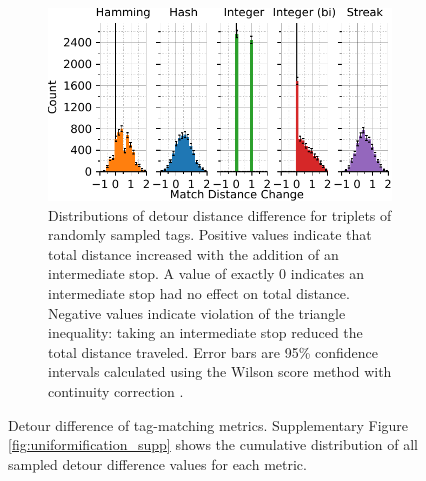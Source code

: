 \begin{figure}
\begin{center}
\begin{minipage}{\linewidth}
\begin{subfigure}[b]{\linewidth}
\includegraphics[width=\linewidth]{img/detour_difference/bitweight=0dot5+seed=1+title=low-triplet-analysis+viz=hist+_data_hathash_hash=6b0749ef97a58721+_script_fullcat_hash=866294f0a66ef153+ext=}
\caption{
Distributions of detour distance difference for triplets of randomly sampled tags.
Positive values indicate that total distance increased with the addition of an intermediate stop.
A value of exactly 0 indicates an intermediate stop had no effect on total distance.
Negative values indicate violation of the triangle inequality: taking an intermediate stop reduced the total distance traveled.
Error bars are 95\% confidence intervals calculated using the Wilson score method with continuity correction \citep{newcombe1998two}.
} \label{fig:detour_difference_distribution}

\end{subfigure}
\end{minipage}

\caption{
Detour difference of tag-matching metrics.
Supplementary Figure \ref{fig:uniformification_supp} shows the cumulative distribution of all sampled detour difference values for each metric.
}
\label{fig:detour_difference}

\end{center}
\end{figure}
